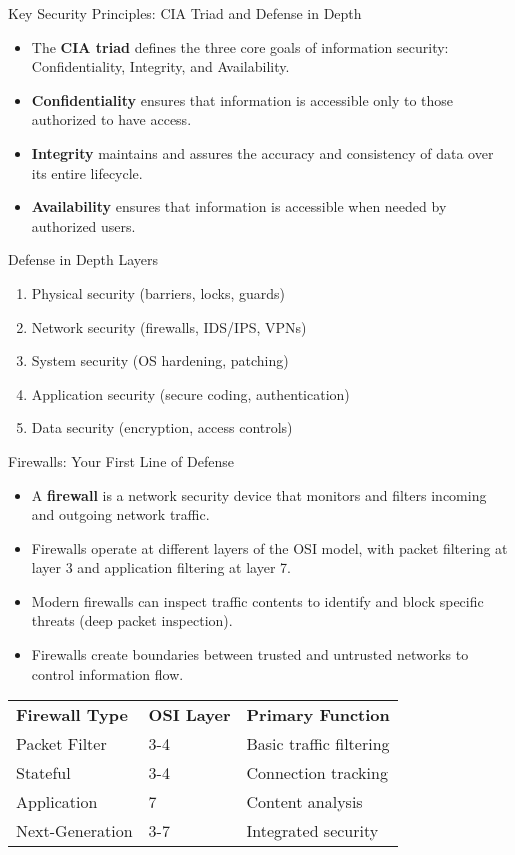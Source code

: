 \documentclass{beamer}
\begin{document}
\begin{frame}{Key Security Principles: CIA Triad and Defense in Depth}
\begin{itemize}
\item The \textbf{CIA triad} defines the three core goals of information security: Confidentiality, Integrity, and Availability.
\item \textbf{Confidentiality} ensures that information is accessible only to those authorized to have access.
\item \textbf{Integrity} maintains and assures the accuracy and consistency of data over its entire lifecycle.
\item \textbf{Availability} ensures that information is accessible when needed by authorized users.
\end{itemize}

\begin{alertblock}{Defense in Depth Layers}
\begin{enumerate}
\item Physical security (barriers, locks, guards)
\item Network security (firewalls, IDS/IPS, VPNs)
\item System security (OS hardening, patching)
\item Application security (secure coding, authentication)
\item Data security (encryption, access controls)
\end{enumerate}
\end{alertblock}
\end{frame}

\begin{frame}{Firewalls: Your First Line of Defense}
\begin{itemize}
\item A \textbf{firewall} is a network security device that monitors and filters incoming and outgoing network traffic.
\item Firewalls operate at different layers of the OSI model, with packet filtering at layer 3 and application filtering at layer 7.
\item Modern firewalls can inspect traffic contents to identify and block specific threats (deep packet inspection).
\item Firewalls create boundaries between trusted and untrusted networks to control information flow.
\end{itemize}

\begin{table}
\begin{tabular}{lll}
\textbf{Firewall Type} & \textbf{OSI Layer} & \textbf{Primary Function} \\
Packet Filter & 3-4 & Basic traffic filtering \\
Stateful & 3-4 & Connection tracking \\
Application & 7 & Content analysis \\
Next-Generation & 3-7 & Integrated security \\
\end{tabular}
\end{table}
\end{frame}
\end{document}
